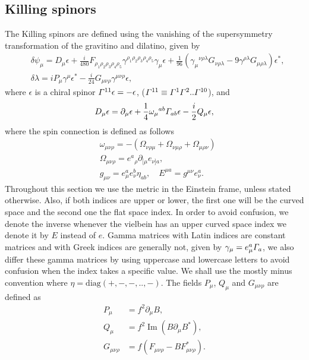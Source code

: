 \documentclass[11pt]{article}
\let\oldGamma=\Gamma
\renewcommand{\Gamma}{\mathnormal{\oldGamma}}
\renewcommand{\Im}{\mathop{\mathrm{Im}}}
\newcommand{\sfrac}[2]{{\textstyle\frac{#1}{#2}}}
\newcommand{\p}{\partial}\newcommand{\quarter}{\sfrac{1}{4}}
\begin{document}
\subsection{Killing spinors}
The Killing spinors are defined using the vanishing of the supersymmetry transformation of the gravitino and dilatino, given by
\begin{align}\label{eq:KSE}
& \delta \psi_\mu = D_\mu \epsilon + \frac{i}{480} F_{\rho_1 \rho_2 \rho_3 \rho_4 \rho_5}\gamma^{\rho_1 \rho_2 \rho_3 \rho_4 \rho_5} \gamma_\mu \epsilon + \frac{1}{96}\left(\gamma_\mu{}^{\nu \rho \lambda}G_{\nu \rho \lambda} - 9 \gamma^{\rho \lambda} G_{\mu \rho \lambda}\right)\epsilon^*,\nonumber\\
& \delta \lambda = i P_\mu \gamma^\mu \epsilon^* - \frac{i}{24}G_{\mu \nu \rho}\gamma^{\mu \nu \rho}\epsilon,
\end{align}
where $\epsilon$ is a chiral spinor $\Gamma^{11}  \epsilon = - \epsilon$, ($\Gamma^{11}\equiv \Gamma^1 \Gamma^2..\Gamma^{10}$), and
\begin{align}
D_\mu \epsilon  = \p_\mu \epsilon +\frac{1}{4}\omega_{\mu}{}^{ab}\Gamma_{ab}\epsilon -\frac{i}{2}Q_\mu \epsilon,
\end{align}
where the spin connection is defined as follows
\begin{align}
&\omega_{\mu \nu \rho} = -( \Omega_{\nu \rho \mu } + \Omega_{\nu \mu \rho} + \Omega_{\mu \rho \nu } )\nonumber\\
&\Omega_{\mu \nu \rho} = e^a{}_\rho \p_{[\mu}e_{\nu] a},\nonumber\\
& g_{\mu \nu} = e^a_\mu e^b_\nu \eta_{ab},\quad
E^{\mu a} = g^{\mu \nu }e_\nu^a.
\end{align}
Throughout this section we use the metric in the Einstein frame, unless stated otherwise.
Also, if both indices are upper or lower, the first one will be the curved space and the second one the flat space index.
In order to avoid confusion, we denote the inverse whenever the vielbein has an upper curved space index we denote it by $E$ instead of $e$.
Gamma matrices with Latin indices are constant matrices and with Greek indices are generally not, given by $\gamma_\mu = e_\mu^a \Gamma_a$, we also differ these gamma matrices by using uppercase and lowercase letters to avoid confusion when the index takes a specific value.
We shall use the mostly minus convention where $\eta = \text{diag}(+,-,-,..,-)$.
The fields $P_\mu$, $Q_\mu$ and $G_{\mu \nu \rho}$ are defined as
\begin{align}
P_\mu & = f^2 \p_\mu B,\nonumber\\
Q_\mu & = f^2 \Im(B \p_\mu B^*),\nonumber\\
G_{\mu \nu \rho} & = f\left(F_{\mu \nu \rho} - B F_{\mu \nu \rho}^*\right).
\end{align}
\end{document}
